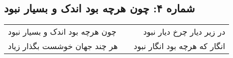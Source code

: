 \begin{center}
\section*{شماره ۴: چون هرچه بود اندک و بسیار نبود}
\label{sec:004}
\begin{longtable}{l p{0.5cm} r}
چون هرچه بود اندک و بسیار نبود
&&
در زیر دیار چرخ دیار نبود
\\
هر چند جهان خوشست بگذار زیاد
&&
انگار که هرچه بود انگار نبود
\\
\end{longtable}
\end{center}
